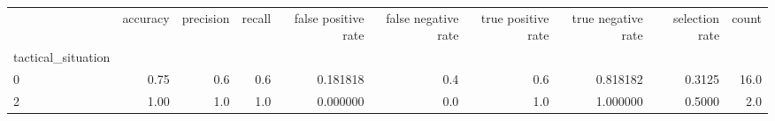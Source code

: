 \begin{tabular}{lrrrrrrrrr}
\toprule
{} &  accuracy &  precision &  recall &  false positive rate &  false negative rate &  true positive rate &  true negative rate &  selection rate &  count \\
tactical\_situation &           &            &         &                      &                      &                     &                     &                 &        \\
\midrule
0                  &      0.75 &        0.6 &     0.6 &             0.181818 &                  0.4 &                 0.6 &            0.818182 &          0.3125 &   16.0 \\
2                  &      1.00 &        1.0 &     1.0 &             0.000000 &                  0.0 &                 1.0 &            1.000000 &          0.5000 &    2.0 \\
\bottomrule
\end{tabular}

